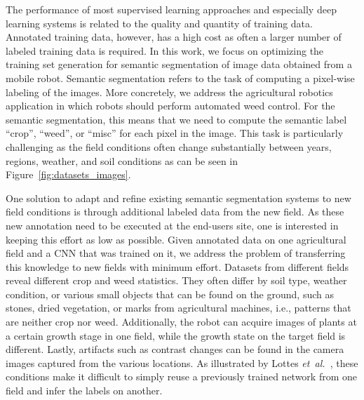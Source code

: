 \documentclass[letterpaper, 10 pt, conference]{ieeeconf}  %
\newcommand\etal{\emph{et~al.}}
\begin{document}
The performance of most supervised learning approaches and especially deep
learning  systems is related to the quality and quantity of training data.
Annotated training data, however, has a high cost as often a larger number of
labeled training data is  required.  In this work, we focus on optimizing the
training set generation for  semantic segmentation of image data obtained
from a mobile robot. Semantic segmentation refers to the task of computing a
pixel-wise  labeling of the images. More concretely, we address the
agricultural robotics  application in which robots should perform automated
weed control. For the semantic  segmentation, this means that we need to
compute the semantic label ``crop'', ``weed'',  or ``misc'' for each pixel in
the image. This task is particularly challenging  as the field conditions
often change substantially between years, regions, weather, and  soil
conditions as can be seen in Figure~\ref{fig:datasets_images}.  

One solution to adapt and refine existing semantic
segmentation systems to new field conditions  is through additional labeled data from the
new field. As these new annotation need to be executed at the end-users site,
one is interested in keeping this effort as low as possible. 
%
Given annotated data on one agricultural field and a CNN that was trained
on it, we address the problem of transferring this knowledge to new fields with
minimum effort.  Datasets from different fields reveal different crop and weed
statistics. They often differ by soil type, weather condition, or
various small objects that can be found  on the ground, such as stones, dried
vegetation, or marks from agricultural machines, i.e., patterns that are
neither crop nor weed. Additionally, the robot can acquire  images of plants
at a certain growth stage in one field, while the growth state on the  target
field is different. Lastly, artifacts such as contrast changes can be found in
the camera images captured from the various locations.  As illustrated by 
Lottes \etal~\cite{lottes2018ral,lottes2017iros}, these conditions make
it difficult to simply reuse a previously trained network from one  field and
infer the labels on another. 
\end{document}
